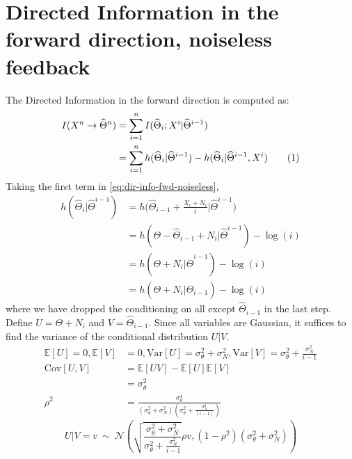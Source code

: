 \documentclass[letterpaper, 10pt, conference]{ieeeconf}
\newcommand\numberthis{\stepcounter{equation}\tag{\theequation}}
\begin{document}
\appendices

\section{Directed Information in the forward direction, noiseless feedback}
\label{app:dir-info-fwd-noiseless}

The Directed Information in the forward direction is computed as:
\begin{align*}
	I(X^n \rightarrow \widehat\Theta^n) &= \sum_{i=1}^n{I(\widehat\Theta_i ; X^i | \widehat\Theta^{i-1})} \\
										&= \sum_{i=1}^n{h(\widehat\Theta_i | \widehat\Theta^{i-1}) - h(\widehat\Theta_i | \widehat\Theta^{i-1}, X^i)} \numberthis \label{eq:dir-info-fwd-noiseless}
\end{align*}
Taking the first term in \eqref{eq:dir-info-fwd-noiseless},
\begin{align*}
	h(\widehat\Theta_i | \widehat\Theta^{i-1}) &= h \bigg( \widehat\Theta_{i-1} + \frac{X_i + N_i}{i} \bigg| \widehat\Theta^{i-1} \bigg) \\
											   &= h(\Theta - \widehat\Theta_{i-1} + N_i | \widehat\Theta^{i-1}) -\log(i) \\
											   &= h(\Theta + N_i | \widehat\Theta^{i-1}) -\log(i) \\
											   &= h(\Theta + N_i | \widehat\Theta_{i-1}) -\log(i)
\end{align*}
where we have dropped the conditioning on all except $\widehat\Theta_{i-1}$ in the last step. %
Define $U = \Theta + N_i$ and $V = \widehat\Theta_{i-1}$. Since all variables are Gaussian, it suffices to find the variance of the conditional distribution $U|V$.
\begin{align*}
	\mathbb{E}[U] = 0,
	\mathbb{E}[V] &= 0, \text{Var}[U] = \sigma_\theta^2 + \sigma_N^2,
	\text{Var}[V] = \sigma_\theta^2+ \frac{\sigma_N^2}{i-1} \\
	\text{Cov}[U,V] &= \mathbb{E}[UV]-\mathbb{E}[U]\mathbb{E}[V] \\
					&= \sigma_\theta^2 \\
	\rho^{2}        &= \frac{\sigma_{\theta}^{4}}{(\sigma_{\theta}^{2}+\sigma_{N}^{2})(\sigma_{\theta}^{2}+\frac{\sigma_{N}^{2}}{(i-1)})}
\end{align*}
\begin{equation*}
	U|V=v\ \sim\ \mathcal{N}\left(\sqrt{\frac{\sigma_{\theta}^{2}+\sigma_{N}^{2}}{\sigma_{\theta}^{2}+\frac{\sigma_{N}^{2}}{i-1}}}\rho v,(1-\rho^{2})(\sigma_{\theta}^{2}+\sigma_{N}^{2})\right)
\end{equation*}
\end{document}
